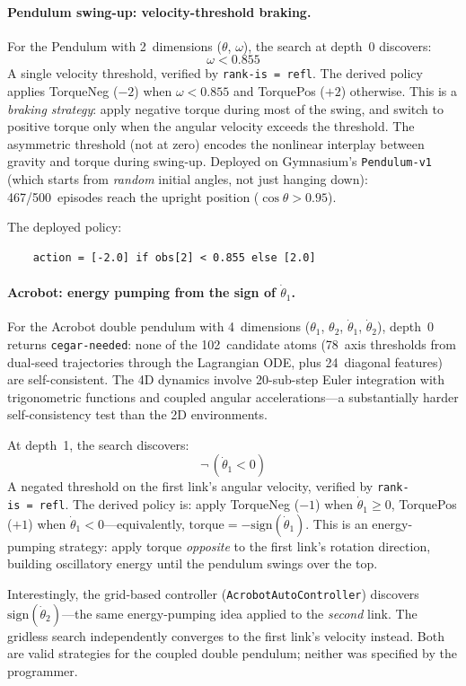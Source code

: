 \documentclass[9pt,a4paper]{article}
\theoremstyle{plain}
\theoremstyle{definition}
\theoremstyle{remark}
\begin{document}
\paragraph{Pendulum swing-up: velocity-threshold braking.}
For the Pendulum with 2~dimensions ($\theta$, $\omega$), the search at depth~0 discovers:
\[
\boxed{\quad \omega < 0.855 \quad}
\]
A single velocity threshold, verified by \texttt{rank-is~=~refl}.  The derived policy applies TorqueNeg ($-2$) when $\omega < 0.855$ and TorquePos ($+2$) otherwise.  This is a \emph{braking strategy}: apply negative torque during most of the swing, and switch to positive torque only when the angular velocity exceeds the threshold.  The asymmetric threshold (not at zero) encodes the nonlinear interplay between gravity and torque during swing-up.  Deployed on Gymnasium's \texttt{Pendulum-v1} (which starts from \emph{random} initial angles, not just hanging down): 467/500~episodes reach the upright position ($\cos\theta > 0.95$).

The deployed policy:
\begin{verbatim}
    action = [-2.0] if obs[2] < 0.855 else [2.0]
\end{verbatim}

\paragraph{Acrobot: energy pumping from the sign of $\dot\theta_1$.}
For the Acrobot double pendulum with 4~dimensions ($\theta_1$, $\theta_2$, $\dot\theta_1$, $\dot\theta_2$), depth~0 returns \texttt{cegar-needed}: none of the 102~candidate atoms (78~axis thresholds from dual-seed trajectories through the Lagrangian ODE, plus 24~diagonal features) are self-consistent.  The 4D dynamics involve 20-sub-step Euler integration with trigonometric functions and coupled angular accelerations---a substantially harder self-consistency test than the 2D environments.

At depth~1, the search discovers:
\[
\boxed{\quad \lnot\,(\dot\theta_1 < 0) \quad}
\]
A negated threshold on the first link's angular velocity, verified by \texttt{rank-is~=~refl}.  The derived policy is: apply TorqueNeg ($-1$) when $\dot\theta_1 \geq 0$, TorquePos ($+1$) when $\dot\theta_1 < 0$---equivalently, $\text{torque} = -\text{sign}(\dot\theta_1)$.  This is an energy-pumping strategy: apply torque \emph{opposite} to the first link's rotation direction, building oscillatory energy until the pendulum swings over the top.

Interestingly, the grid-based controller (\texttt{AcrobotAutoController}) discovers $\text{sign}(\dot\theta_2)$---the same energy-pumping idea applied to the \emph{second} link.  The gridless search independently converges to the first link's velocity instead.  Both are valid strategies for the coupled double pendulum; neither was specified by the programmer.
\end{document}
